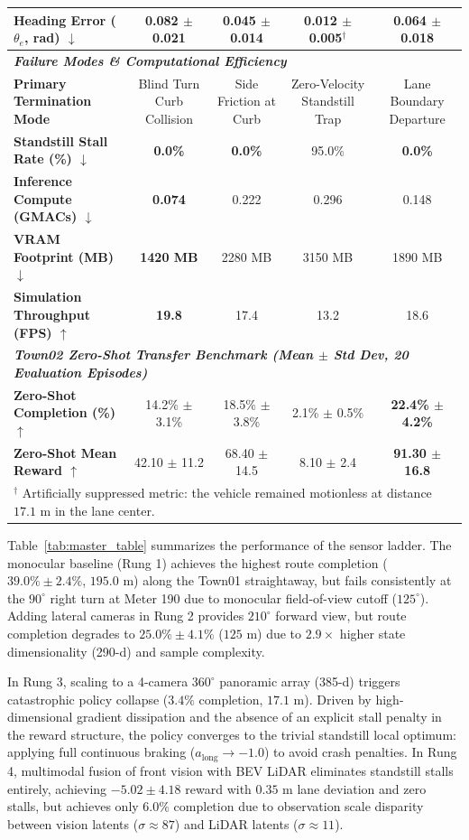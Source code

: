 \documentclass[conference]{IEEEtran}
\begin{document}
\begin{table}[!t]
{\begin{tabular}{lcccc}
\textbf{Heading Error ($\theta_e$, rad) $\downarrow$} & 0.082 $\pm$ 0.021 & \textbf{0.045 $\pm$ 0.014} & 0.012 $\pm$ 0.005$^\dagger$ & 0.064 $\pm$ 0.018 \\
\midrule
\multicolumn{5}{l}{\textit{\textbf{Failure Modes \& Computational Efficiency}}} \\
\midrule
\textbf{Primary Termination Mode} & Blind Turn Curb Collision & Side Friction at Curb & Zero-Velocity Standstill Trap & Lane Boundary Departure \\
\textbf{Standstill Stall Rate (\%) $\downarrow$} & \textbf{0.0\%} & \textbf{0.0\%} & 95.0\% & \textbf{0.0\%} \\
\textbf{Inference Compute (GMACs) $\downarrow$} & \textbf{0.074} & 0.222 & 0.296 & 0.148 \\
\textbf{VRAM Footprint (MB) $\downarrow$} & \textbf{1420 MB} & 2280 MB & 3150 MB & 1890 MB \\
\textbf{Simulation Throughput (FPS) $\uparrow$} & \textbf{19.8} & 17.4 & 13.2 & 18.6 \\
\midrule
\multicolumn{5}{l}{\textit{\textbf{Town02 Zero-Shot Transfer Benchmark (Mean $\pm$ Std Dev, 20 Evaluation Episodes)}}} \\
\midrule
\textbf{Zero-Shot Completion (\%) $\uparrow$} & 14.2\% $\pm$ 3.1\% & 18.5\% $\pm$ 3.8\% & 2.1\% $\pm$ 0.5\% & \textbf{22.4\% $\pm$ 4.2\%} \\
\textbf{Zero-Shot Mean Reward $\uparrow$} & 42.10 $\pm$ 11.2 & 68.40 $\pm$ 14.5 & 8.10 $\pm$ 2.4 & \textbf{91.30 $\pm$ 16.8} \\
\bottomrule
\multicolumn{5}{l}{\footnotesize $^\dagger$ Artificially suppressed metric: the vehicle remained motionless at distance $17.1\text{ m}$ in the lane center.}
\end{tabular}
}
\end{table}

Table~\ref{tab:master_table} summarizes the performance of the sensor ladder. The monocular baseline (Rung 1) achieves the highest route completion ($39.0\% \pm 2.4\%$, $195.0\text{ m}$) along the Town01 straightaway, but fails consistently at the $90^\circ$ right turn at Meter 190 due to monocular field-of-view cutoff ($125^\circ$). Adding lateral cameras in Rung 2 provides $210^\circ$ forward view, but route completion degrades to $25.0\% \pm 4.1\%$ ($125\text{ m}$) due to $2.9\times$ higher state dimensionality (290-d) and sample complexity.

In Rung 3, scaling to a 4-camera $360^\circ$ panoramic array (385-d) triggers catastrophic policy collapse ($3.4\%$ completion, $17.1\text{ m}$). Driven by high-dimensional gradient dissipation and the absence of an explicit stall penalty in the reward structure, the policy converges to the trivial standstill local optimum: applying full continuous braking ($a_{\text{long}} \to -1.0$) to avoid crash penalties. In Rung 4, multimodal fusion of front vision with BEV LiDAR eliminates standstill stalls entirely, achieving $-5.02 \pm 4.18$ reward with $0.35\text{ m}$ lane deviation and zero stalls, but achieves only $6.0\%$ completion due to observation scale disparity between vision latents ($\sigma \approx 87$) and LiDAR latents ($\sigma \approx 11$).
\end{document}
